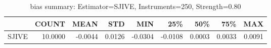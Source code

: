 \begin{table}[ht]
\centering
\caption{bias summary: Estimator=SJIVE, Instruments=250, Strength=0.80}
\begin{tabular}{lrrrrrrrr}
\toprule
 & COUNT & MEAN & STD & MIN & 25\% & 50\% & 75\% & MAX \\
\midrule
SJIVE & 10.0000 & -0.0044 & 0.0126 & -0.0304 & -0.0108 & 0.0003 & 0.0033 & 0.0091 \\
\bottomrule
\end{tabular}
\end{table}
